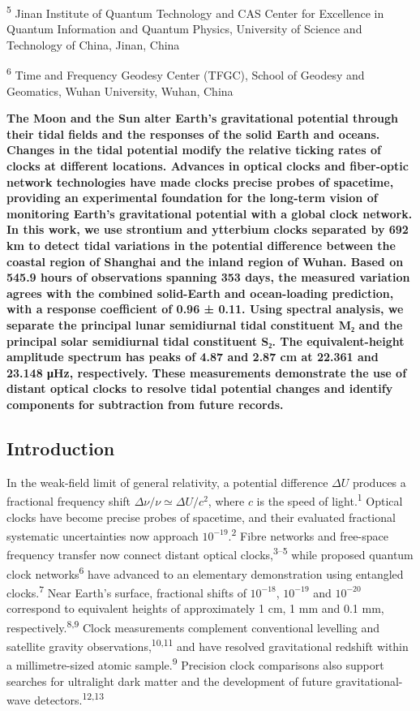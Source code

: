 \documentclass[
  11pt,
  a4paper,
]{article}
\begin{document}
\textsuperscript{5} Jinan Institute of Quantum Technology and CAS Center
for Excellence in Quantum Information and Quantum Physics, University of
Science and Technology of China, Jinan, China

\textsuperscript{6} Time and Frequency Geodesy Center (TFGC), School of
Geodesy and Geomatics, Wuhan University, Wuhan, China

\endgroup

\textbf{The Moon and the Sun alter Earth's gravitational potential
through their tidal fields and the responses of the solid Earth and
oceans. Changes in the tidal potential modify the relative ticking rates
of clocks at different locations. Advances in optical clocks and
fiber-optic network technologies have made clocks precise probes of
spacetime, providing an experimental foundation for the long-term vision
of monitoring Earth's gravitational potential with a global clock
network. In this work, we use strontium and ytterbium clocks separated
by 692 km to detect tidal variations in the potential difference between
the coastal region of Shanghai and the inland region of Wuhan. Based on
545.9 hours of observations spanning 353 days, the measured variation
agrees with the combined solid-Earth and ocean-loading prediction, with
a response coefficient of 0.96 ± 0.11. Using spectral analysis, we
separate the principal lunar semidiurnal tidal constituent M₂ and the
principal solar semidiurnal tidal constituent S₂. The equivalent-height
amplitude spectrum has peaks of 4.87 and 2.87 cm at 22.361 and 23.148
μHz, respectively. These measurements demonstrate the use of distant
optical clocks to resolve tidal potential changes and identify
components for subtraction from future records.}

\hypertarget{introduction}{%
\subsection{Introduction}\label{introduction}}

In the weak-field limit of general relativity, a potential difference
\(\Delta U\) produces a fractional frequency shift
\(\Delta\nu/\nu\simeq\Delta U/c^2\), where \(c\) is the speed of
light.\textsuperscript{1} Optical clocks have become precise probes of
spacetime, and their evaluated fractional systematic uncertainties now
approach \(10^{-19}\).\textsuperscript{2} Fibre networks and free-space
frequency transfer now connect distant optical
clocks,\textsuperscript{3--5} while proposed quantum clock
networks\textsuperscript{6} have advanced to an elementary demonstration
using entangled clocks.\textsuperscript{7} Near Earth's surface,
fractional shifts of \(10^{-18}\), \(10^{-19}\) and \(10^{-20}\)
correspond to equivalent heights of approximately 1 cm, 1 mm and 0.1 mm,
respectively.\textsuperscript{8,9} Clock measurements complement
conventional levelling and satellite gravity
observations,\textsuperscript{10,11} and have resolved gravitational
redshift within a millimetre-sized atomic sample.\textsuperscript{9}
Precision clock comparisons also support searches for ultralight dark
matter and the development of future gravitational-wave
detectors.\textsuperscript{12,13}
\end{document}
